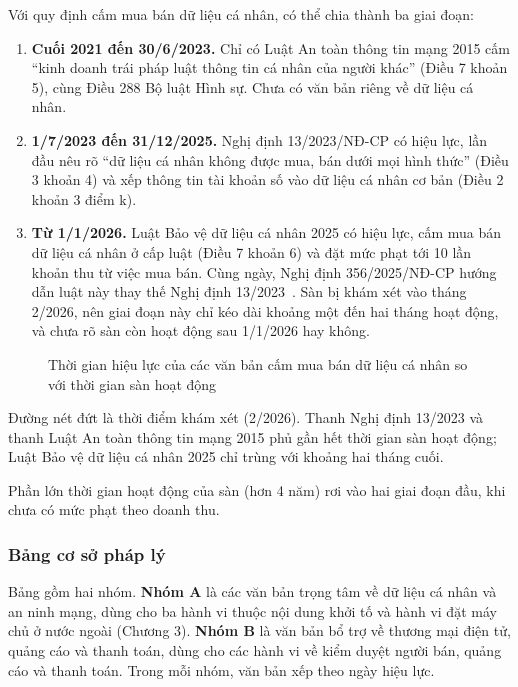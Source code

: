 Với quy định cấm mua bán dữ liệu cá nhân, có thể chia thành ba giai đoạn:

\begin{enumerate}
\item \textbf{Cuối 2021 đến 30/6/2023.} Chỉ có Luật An toàn thông tin mạng 2015 cấm “kinh doanh trái pháp luật thông tin cá nhân của người khác” (Điều 7 khoản 5), cùng Điều 288 Bộ luật Hình sự. Chưa có văn bản riêng về dữ liệu cá nhân.
\item \textbf{1/7/2023 đến 31/12/2025.} Nghị định 13/2023/NĐ-CP có hiệu lực, lần đầu nêu rõ “dữ liệu cá nhân không được mua, bán dưới mọi hình thức” (Điều 3 khoản 4) và xếp thông tin tài khoản số vào dữ liệu cá nhân cơ bản (Điều 2 khoản 3 điểm k).
\item \textbf{Từ 1/1/2026.} Luật Bảo vệ dữ liệu cá nhân 2025 có hiệu lực, cấm mua bán dữ liệu cá nhân ở cấp luật (Điều 7 khoản 6) và đặt mức phạt tới 10 lần khoản thu từ việc mua bán. Cùng ngày, Nghị định 356/2025/NĐ-CP hướng dẫn luật này thay thế Nghị định 13/2023~\cite{nd356-2025}. Sàn bị khám xét vào tháng 2/2026, nên giai đoạn này chỉ kéo dài khoảng một đến hai tháng hoạt động, và chưa rõ sàn còn hoạt động sau 1/1/2026 hay không.
\end{enumerate}
\begin{figure}[H]
\centering

\caption{Thời gian hiệu lực của các văn bản cấm mua bán dữ liệu cá nhân so với thời gian sàn hoạt động}
\label{fig:2.1}
\end{figure}

Đường nét đứt là thời điểm khám xét (2/2026). Thanh Nghị định 13/2023 và thanh Luật An toàn thông tin mạng 2015 phủ gần hết thời gian sàn hoạt động; Luật Bảo vệ dữ liệu cá nhân 2025 chỉ trùng với khoảng hai tháng cuối.

Phần lớn thời gian hoạt động của sàn (hơn 4 năm) rơi vào hai giai đoạn đầu, khi chưa có mức phạt theo doanh thu.

\subsubsection{Bảng cơ sở pháp lý}\label{sec:2.2.2}

Bảng gồm hai nhóm. \textbf{Nhóm A} là các văn bản trọng tâm về dữ liệu cá nhân và an ninh mạng, dùng cho ba hành vi thuộc nội dung khởi tố và hành vi đặt máy chủ ở nước ngoài (Chương 3). \textbf{Nhóm B} là văn bản bổ trợ về thương mại điện tử, quảng cáo và thanh toán, dùng cho các hành vi về kiểm duyệt người bán, quảng cáo và thanh toán. Trong mỗi nhóm, văn bản xếp theo ngày hiệu lực.

